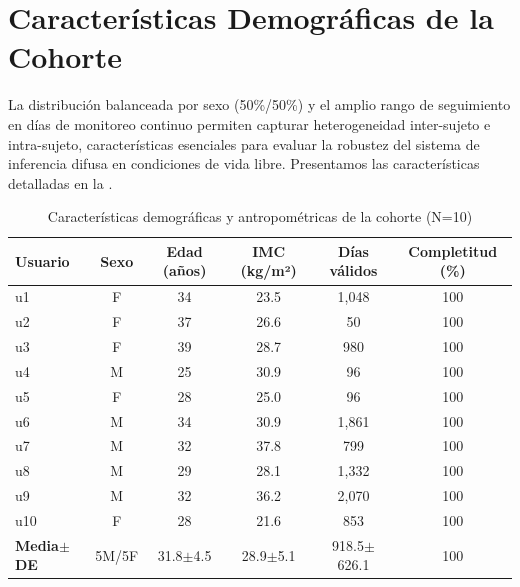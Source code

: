 \section{Características Demográficas de la Cohorte}
\label{sec:caracteristicas_cohorte}

La distribución balanceada por sexo (50\%/50\%) y el amplio rango de seguimiento en días de monitoreo continuo permiten capturar heterogeneidad inter-sujeto e intra-sujeto, características esenciales para evaluar la robustez del sistema de inferencia difusa en condiciones de vida libre. Presentamos las características detalladas en la .

\begin{table}[H]
\centering
\caption{Características demográficas y antropométricas de la cohorte (N=10)}
\label{tab:cohorte_caracteristicas}
\begingroup
\setlength{\tabcolsep}{5pt}
\renewcommand{\arraystretch}{1.1}
\small
\begin{tabular}{@{}lccccc@{}}
\toprule
\textbf{Usuario} & \textbf{Sexo} & \textbf{Edad (años)} & \textbf{IMC (kg/m²)} & \textbf{Días válidos} & \textbf{Completitud (\%)} \\
\midrule
u1 & F & 34 & 23.5 & 1,048 & 100 \\
u2 & F & 37 & 26.6 & 50    & 100 \\
u3 & F & 39 & 28.7 & 980   & 100 \\
u4 & M & 25 & 30.9 & 96    & 100 \\
u5 & F & 28 & 25.0 & 96    & 100 \\
u6 & M & 34 & 30.9 & 1,861 & 100 \\
u7 & M & 32 & 37.8 & 799   & 100 \\
u8 & M & 29 & 28.1 & 1,332 & 100 \\
u9 & M & 32 & 36.2 & 2,070 & 100 \\
u10 & F & 28 & 21.6 & 853   & 100 \\
\midrule
\textbf{Media$\pm$DE} & 5M/5F & 31.8$\pm$4.5 & 28.9$\pm$5.1 & 918.5$\pm$626.1 & 100 \\
\bottomrule
\end{tabular}
\endgroup
\end{table}

\FloatBarrier

